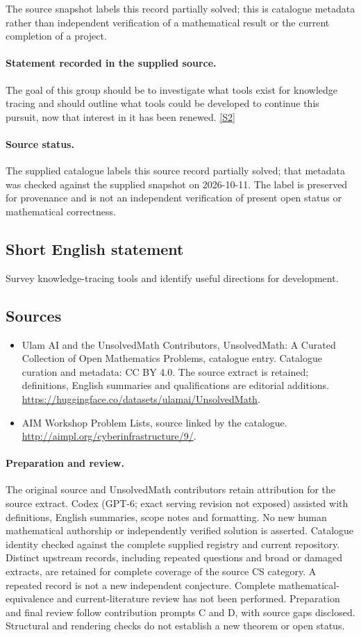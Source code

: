 \documentclass[11pt]{article}
\begin{document}
The source snapshot labels this record partially solved; this is catalogue metadata rather than independent verification of a mathematical result or the current completion of a project.
\paragraph{Statement recorded in the supplied source.}
The goal of this group should be to investigate what tools exist for knowledge tracing and should outline what tools could be developed to continue this pursuit, now that interest in it has been renewed. \href{http://aimpl.org/cyberinfrastructure/9/}{[S2]}
\paragraph{Source status.}
The supplied catalogue labels this source record partially solved; that metadata was checked against the supplied snapshot on 2026-10-11. The label is preserved for provenance and is not an independent verification of present open status or mathematical correctness.
\subsection{Short English statement}
Survey knowledge-tracing tools and identify useful directions for development.
\subsection{Sources}
\begin{itemize}
\item[S1] Ulam AI and the UnsolvedMath Contributors, UnsolvedMath: A Curated Collection of Open Mathematics Problems, catalogue entry. Catalogue curation and metadata: CC BY 4.0. The source extract is retained; definitions, English summaries and qualifications are editorial additions.
\url{https://huggingface.co/datasets/ulamai/UnsolvedMath}.
\item[S2] AIM Workshop Problem Lists, source linked by the catalogue.
\url{http://aimpl.org/cyberinfrastructure/9/}.
\end{itemize}
\paragraph{Preparation and review.}
The original source and UnsolvedMath contributors retain attribution for the source extract. Codex (GPT-6; exact serving revision not exposed) assisted with definitions, English summaries, scope notes and formatting. No new human mathematical authorship or independently verified solution is asserted. Catalogue identity checked against the complete supplied registry and current repository. Distinct upstream records, including repeated questions and broad or damaged extracts, are retained for complete coverage of the source CS category. A repeated record is not a new independent conjecture. Complete mathematical-equivalence and current-literature review has not been performed. Preparation and final review follow contribution prompts C and D, with source gaps disclosed. Structural and rendering checks do not establish a new theorem or open status.
\label{end:statement}
\end{document}
